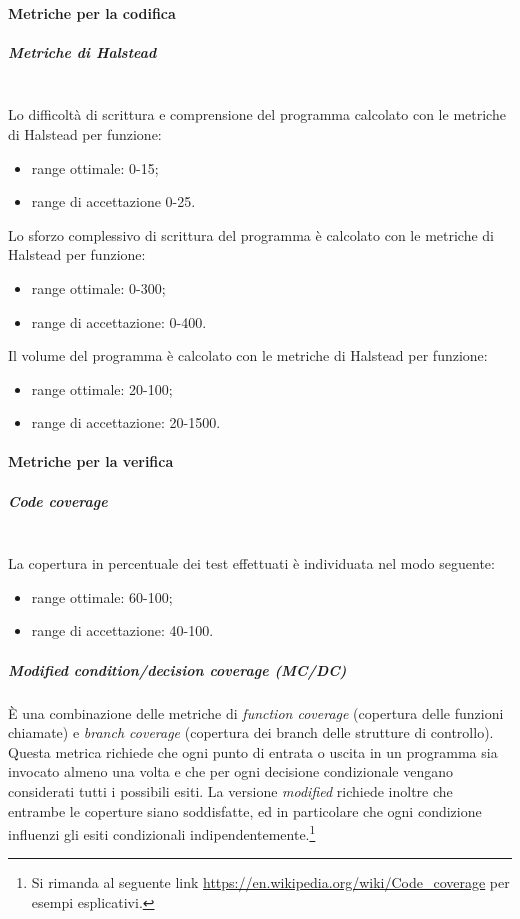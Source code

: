 \paragraph{Metriche per la codifica}\mbox{}
\subparagraph{Metriche di Halstead}\mbox{}\\

Lo difficoltà di scrittura e comprensione del programma calcolato con le metriche di Halstead per funzione:
\begin{itemize}
	\item range ottimale: 0-15;
	\item range di accettazione 0-25.
\end{itemize}

Lo sforzo complessivo di scrittura del programma è calcolato con le metriche di Halstead per funzione:
\begin{itemize}
	\item range ottimale: 0-300;
	\item range di accettazione: 0-400.
\end{itemize}

Il volume del programma è calcolato con le metriche di Halstead per funzione:
\begin{itemize}
	\item range ottimale: 20-100;
	\item range di accettazione: 20-1500.
\end{itemize}

\paragraph{Metriche per la verifica}\mbox{}
\subparagraph{Code coverage}\mbox{}\\
La copertura in percentuale dei test effettuati è individuata nel modo seguente:
\begin{itemize}
	\item range ottimale: 60-100;
	\item range di accettazione: 40-100.
\end{itemize}

\subparagraph{Modified condition/decision coverage (MC/DC)}
\`{E} una combinazione delle metriche di \textit{function coverage} (copertura delle funzioni chiamate) e \textit{branch coverage} (copertura dei branch delle strutture di controllo). Questa metrica richiede che ogni punto di entrata o uscita in un programma sia invocato almeno una volta e che per ogni decisione condizionale vengano considerati tutti i possibili esiti. La versione \textit{modified} richiede inoltre che entrambe le coperture siano soddisfatte, ed in particolare che ogni condizione influenzi gli esiti condizionali indipendentemente.\footnote{Si rimanda al seguente link \url{https://en.wikipedia.org/wiki/Code_coverage} per esempi esplicativi.}

